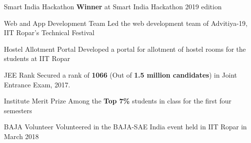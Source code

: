 
\begin{misc}


\cvskill
{Smart India Hackathon} %
{{ \textbf{Winner} at Smart India Hackathon 2019 edition}}

\cvskill
{Web and App Development Team} %
{{Led the web development team of Advitiya-19, IIT Ropar's Technical Festival}}


\cvskill
{Hostel Allotment Portal} %
{{Developed a portal for allotment of hostel rooms for the students at IIT Ropar}}


\cvskill
{JEE Rank} %
{{Secured a rank of }\textbf{1066} { (Out of \textbf{1.5 million candidates}) }{in Joint Entrance Exam, 2017.}}

\cvskill
{Institute Merit Prize} %
{{Among the \textbf{Top 7\%} students in class for the first four semesters}}



\cvskill
{BAJA Volunteer} %
{{Volunteered in the BAJA-SAE India event held in IIT Ropar in March 2018}}

\end{misc}
